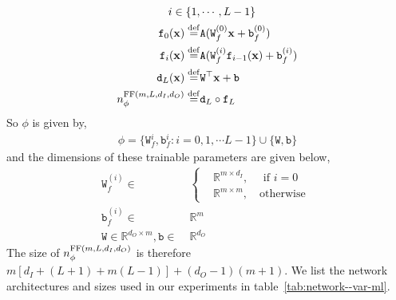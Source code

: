 \begin{align}
    i\in\{1,&\cdots, L-1\}\\
    \mathtt f_{0}(\mathbf x) \stackrel{\rm def}{=}& \mathtt A(\mathtt W_f^{(0)}\mathbf x + \mathtt b_f^{(0)})\\
    \mathtt f_{i}(\mathbf x) \stackrel{\rm def}{=}& \mathtt A(\mathtt W_f^{(i)}\mathtt f_{i-1}(\mathbf x) + \mathtt b_f^{(i)})\\
    \mathtt d_L(\mathbf x)\stackrel{\rm def}{=}&\mathtt W^\top\mathbf x + \mathtt b\\
    n^{{\rm FF}(m, L, d_I, d_O)}_\phi \stackrel{\rm def}{=}& \mathtt d_L\circ \mathtt f_L\label{eq:def-FF--var-ml} 
\end{align}
So $\phi$ is given by,
\begin{align}
    \phi=\{\mathtt W^{i}_f, \mathtt b^{i}_f:i=0,1,\cdots L-1\}\cup\{\mathtt W, \mathtt b\}
\end{align}
and the dimensions of these trainable parameters are given below,
\begin{align}
   \mathtt W_f^{(i)} \in&\;\begin{cases}
   &\mathbb R^{m\times d_I},\quad\text{ if }i=0\\
   &\mathbb R^{m\times m},\quad\text{otherwise }\end{cases}\\
   \mathtt b_f^{(i)}\in&\;\mathbb R^m\\
   \mathtt W\in\mathbb R^{d_O\times m}, \mathtt b\in&\;\mathbb R^{d_O}
\end{align}
The size of $n^{{\rm FF}(m, L, d_I, d_O)}_\phi$ is therefore $m[d_I + (L+1) + m(L-1)]+(d_O-1)(m+1)$. 
We list the network architectures and sizes used in our experiments in table~\ref{tab:network--var-ml}.
